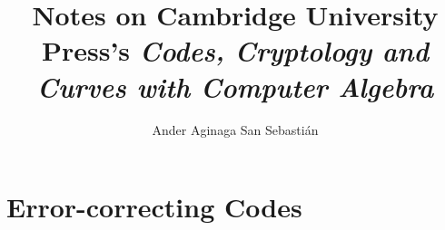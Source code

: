 


	\title{\textbf{Notes on Cambridge University Press's \textit{Codes, Cryptology and Curves with Computer Algebra}}}
	\author{Ander Aginaga San Sebastián}
	\date{}
	\maketitle
	
	\tableofcontents
	
	\chapter{Error-correcting Codes}
	

